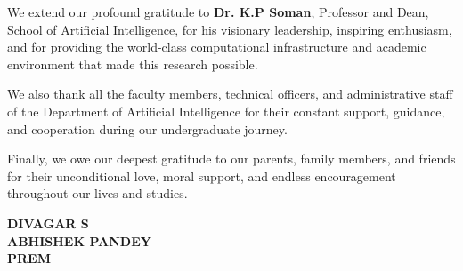 \documentclass[a4paper, 12pt]{report}
\theoremstyle{definition}
\begin{document}
    We extend our profound gratitude to \textbf{Dr. K.P Soman}, Professor and Dean, School of Artificial Intelligence, for his visionary leadership, inspiring enthusiasm, and for providing the world-class computational infrastructure and academic environment that made this research possible.

    We also thank all the faculty members, technical officers, and administrative staff of the Department of Artificial Intelligence for their constant support, guidance, and cooperation during our undergraduate journey.

    Finally, we owe our deepest gratitude to our parents, family members, and friends for their unconditional love, moral support, and endless encouragement throughout our lives and studies.
	
	\vspace{1.5cm}
	\begin{flushright}
		\textbf{DIVAGAR S}\\
        \textbf{ABHISHEK PANDEY}\\
        \textbf{PREM}
	\end{flushright}

	\listoffigures
	\listoftables
	\newpage

\end{document}
